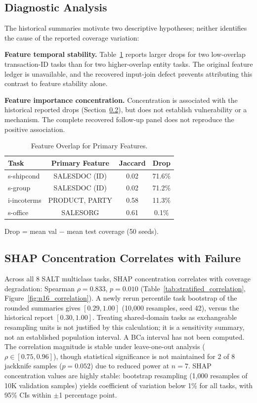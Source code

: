 \documentclass[accepted]{uai2026} %
\begin{document}
\subsection{Diagnostic Analysis}

The historical summaries motivate two descriptive hypotheses; neither identifies the cause of the reported coverage variation:

\textbf{Feature temporal stability.} Table~\ref{tab:overlap} reports larger drops for two low-overlap transaction-ID tasks than for two higher-overlap entity tasks. The original feature ledger is unavailable, and the recovered input-join defect prevents attributing this contrast to feature stability alone.

\textbf{Feature importance concentration.} Concentration is associated with the historical reported drops (Section~\ref{sec:shap_results}), but does not establish vulnerability or a mechanism. The complete recovered follow-up panel does not reproduce the positive association.

\begin{table}[t]
\centering
\caption{Feature Overlap for Primary Features.}\label{tab:overlap}
\small
\begin{tabular}{lccc}
\toprule
Task & Primary Feature & Jaccard & Drop \\
\midrule
s-shipcond & SALESDOC (ID) & 0.02 & 71.6\% \\
s-group & SALESDOC (ID) & 0.02 & 71.2\% \\
i-incoterms & PRODUCT, PARTY & 0.58 & 11.3\% \\
s-office & SALESORG & 0.61 & 0.1\% \\
\bottomrule
\end{tabular}


\raggedright
\footnotesize
Drop = mean val $-$ mean test coverage (50 seeds).
\end{table}

\subsection{SHAP Concentration Correlates with Failure}\label{sec:shap_results}

Across all 8 SALT multiclass tasks, SHAP concentration correlates with coverage degradation: Spearman $\rho = 0.833$, $p = 0.010$ (Table~\ref{tab:stratified_correlation}, Figure~\ref{fig:n16_correlation}). A newly rerun percentile task bootstrap of the rounded summaries gives $[0.29,1.00]$ (10,000 resamples, seed 42), versus the historical report $[0.30,1.00]$. Treating shared-domain tasks as exchangeable resampling units is not justified by this calculation; it is a sensitivity summary, not an established population interval. A BCa interval has not been computed. The correlation magnitude is stable under leave-one-out analysis ($\rho \in [0.75, 0.96]$), though statistical significance is not maintained for 2 of 8 jackknife samples ($p = 0.052$) due to reduced power at $n=7$. SHAP concentration values are highly stable: bootstrap resampling (1,000 resamples of 10K validation samples) yields coefficient of variation below 1\% for all tasks, with 95\% CIs within $\pm$1 percentage point.
\end{document}
